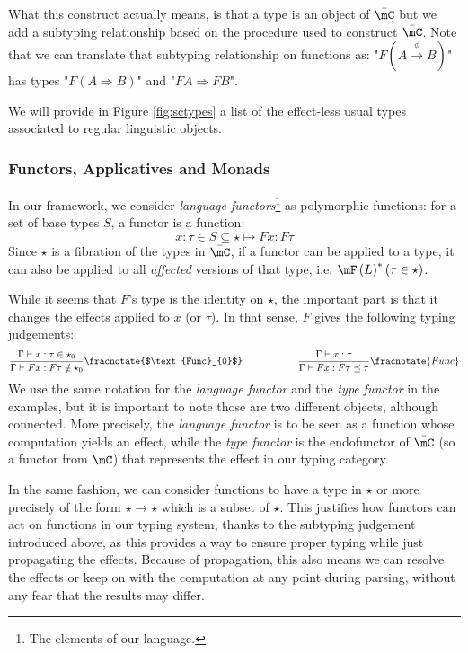 What this construct actually means, is that a type is an object of $\bar{\mC}$
but we add a subtyping relationship based on the procedure used to construct
$\bar{\mC}$.
Note that we can translate that subtyping relationship on functions as:
"$F\left( A \xrightarrow{\phi} B \right)$" has types
"$F\left( A\Rightarrow B \right)$" and "$FA \Rightarrow FB$".

We will provide in Figure \ref{fig:sctypes} a list of the effect-less usual
types associated to regular linguistic objects.

\subsubsection{Functors, Applicatives and Monads}
\label{subsubsec:functors}
In our framework, we consider \emph{language functors}\footnote{The elements of
	our language.} as polymorphic functions: for a set of base types
$S$, a functor is a function:
\begin{equation*}
	x: \tau\in S\subseteq \star \mapsto F x: F\tau
\end{equation*}
Since $\star$ is a fibration of the types in $\bar{\mC}$, if a functor can be
applied to a type, it can also be applied to all \emph{affected} versions of
that type, i.e. $\mF\left( L \right)^{*}(\tau\in \star)$.

While it seems that $F$'s type is the identity on $\star$,
the important part is that it changes the effects applied to $x$ (or $\tau$).
In that sense, $F$ gives the following typing judgements:
\begin{equation*}
	\frac{\Gamma\vdash x: \tau \in \star_{0}}{\Gamma\vdash F x: F\tau \notin
		\star_{0}}\fracnotate{$\text{Func}_{0}$} \hspace{2cm} \frac{\Gamma\vdash x:
		\tau}{\Gamma\vdash Fx : F\tau\preceq \tau}\fracnotate{Func}
\end{equation*}
We use the same notation for the \emph{language functor} and the
\emph{type functor} in the examples, but it is important to note those are two
different objects, although connected.
More precisely, the \emph{language functor} is to be seen as a function whose
computation yields an effect, while the \emph{type functor} is the endofunctor
of $\bar{\mC}$ (so a functor from $\mC$) that represents the effect in our
typing category.

In the same fashion, we can consider functions to have a type in $\star$ or
more precisely of the form $\star \to \star$ which is a subset of $\star$.
This justifies how functors can act on functions in our typing system, thanks
to the subtyping judgement introduced above, as this provides a way to ensure
proper typing while just propagating the effects.
Because of propagation, this also means we can resolve the effects or keep on
with the computation at any point during parsing, without any fear that the
results may differ.

